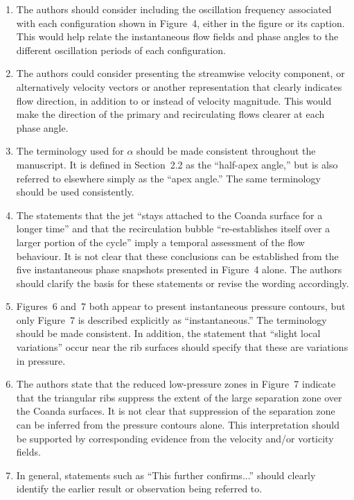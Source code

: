 \documentclass[11pt]{article}
\begin{document}
\begin{enumerate}
		\item The authors should consider including the oscillation frequency associated with each configuration shown in Figure~4, either in the figure or its caption. This would help relate the instantaneous flow fields and phase angles to the different oscillation periods of each configuration.
		
		\item The authors could consider presenting the streamwise velocity component, or alternatively velocity vectors or another representation that clearly indicates flow direction, in addition to or instead of velocity magnitude. This would make the direction of the primary and recirculating flows clearer at each phase angle.
		
		\item The terminology used for $\alpha$ should be made consistent throughout the manuscript. It is defined in Section~2.2 as the ``half-apex angle,'' but is also referred to elsewhere simply as the ``apex angle.'' The same terminology should be used consistently.
		
		\item The statements that the jet ``stays attached to the Coanda surface for a longer time'' and that the recirculation bubble ``re-establishes itself over a larger portion of the cycle'' imply a temporal assessment of the flow behaviour. It is not clear that these conclusions can be established from the five instantaneous phase snapshots presented in Figure~4 alone. The authors should clarify the basis for these statements or revise the wording accordingly.
		
		\item Figures~6 and~7 both appear to present instantaneous pressure contours, but only Figure~7 is described explicitly as ``instantaneous.'' The terminology should be made consistent. In addition, the statement that ``slight local variations'' occur near the rib surfaces should specify that these are variations in pressure.
		
		\item The authors state that the reduced low-pressure zones in Figure~7 indicate that the triangular ribs suppress the extent of the large separation zone over the Coanda surfaces. It is not clear that suppression of the separation zone can be inferred from the pressure contours alone. This interpretation should be supported by corresponding evidence from the velocity and/or vorticity fields.
		
		\item In general, statements such as ``This further confirms...'' should clearly identify the earlier result or observation being referred to.
		

\end{enumerate}
\end{document}
